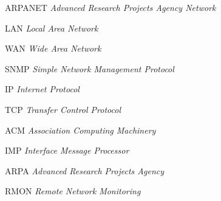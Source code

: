 
\begin{SingleSpace}

\begin{siglas}
\item[ARPANET] \textit{Advanced Research Projects Agency Network}
\item[LAN] \textit{Local Area Network}
\item[WAN] \textit{Wide Area Network}
\item[SNMP] \textit{Simple Network Management Protocol}
\item[IP] \textit{Internet Protocol}
\item[TCP] \textit{Transfer Control Protocol}
\item[ACM] \textit{Association Computing Machinery}
\item[IMP] \textit{Interface Message Processor}
\item[ARPA] \textit{Advanced Research Projects Agency}
\item[RMON] \textit{Remote Network Monitoring}
\end{siglas}

\end{SingleSpace}
